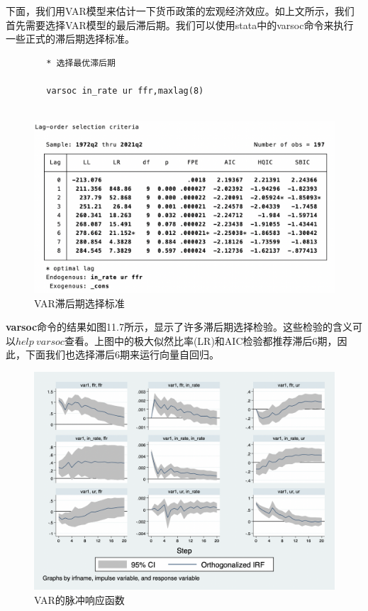 \documentclass[cn,12pt,math=newtx,citestyle=gb7714-2015,bibstyle=gb7714-2015]{elegantbook}
\begin{document}
    下面，我们用VAR模型来估计一下货币政策的宏观经济效应。如上文所示，我们首先需要选择VAR模型的最后滞后期。我们可以使用stata中的varsoc命令来执行一些正式的滞后期选择标准。
    
    \begin{lstlisting}
    	* 选择最优滞后期
    	
    	varsoc in_rate ur ffr,maxlag(8)
    	
    \end{lstlisting}


\begin{figure}[tbph]
	\centering
	\includegraphics[width=1\linewidth]{lagsc}
	\caption{VAR滞后期选择标准}
	\label{fig:lagsc}
\end{figure}

	\textbf{varsoc}命令的结果如图11.7所示，显示了许多滞后期选择检验。这些检验的含义可以$help~ varsoc$查看。上图中的极大似然比率(LR)和AIC检验都推荐滞后6期，因此，下面我们也选择滞后6期来运行向量自回归。
	
	
	
	\begin{figure}[tbph]
		\centering
		\includegraphics[width=1\linewidth]{var_irf}
		\caption{VAR的脉冲响应函数}
		\label{fig:var_irf}
	\end{figure}
	
\end{document}
